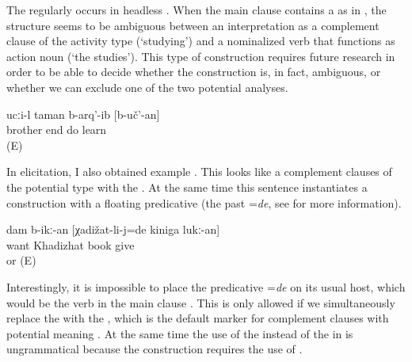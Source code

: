The  regularly occurs in headless  . When the main clause contains a  as in , the structure seems to be ambiguous between an interpretation as a complement clause of the activity type (`studying') and a nominalized verb that functions as action noun (`the studies'). This type of construction requires future research in order to be able to decide whether the construction is, in fact, ambiguous, or whether we can exclude one of the two potential analyses.
 	
\begin{exe}	
	\ex	\label{ex:‎Brother finished to study / studying / the studies}
	\gll	ucːi-l	taman	b-arq'-ib	[b-uč'-an]\\
		brother	end	do	learn\\
	\glt	{} (E)
\end{exe}


In elicitation, I also obtained example . This looks like a complement clauses of the potential type with the . At the same time this sentence instantiates a  construction with a floating predicative  (the past  =\textit{de}, see  for more information). 

%
\begin{exe}
	\ex	\label{ex:‎I wanted to give the book to Khadizhat}
	\gll	dam	b-ikː-an	[χadižat-li-j=de	kiniga	lukː-an]\\
			want	Khadizhat	book	give\\
	\glt	{} or  (E)
	\end{exe}

Interestingly, it is impossible to place the predicative  =\textit{de} on its usual host, which would be the verb in the main clause . This is only allowed if we simultaneously replace the  with the , which is the default marker for complement clauses with potential meaning . At the same time the use of the  instead of the  in  is ungrammatical because the  construction requires the use of .

